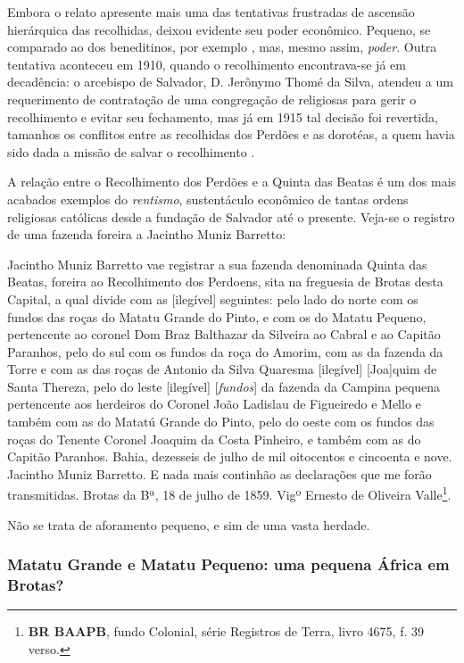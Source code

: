 Embora o relato apresente mais uma das tentativas frustradas de ascensão hierárquica das recolhidas, deixou evidente seu poder econômico. Pequeno, se comparado ao dos beneditinos, por exemplo \cite{bento_tombo_1945}, mas, mesmo assim, \textit{poder}. Outra tentativa aconteceu em 1910, quando o recolhimento encontrava-se já em decadência: o arcebispo de Salvador, D. Jerônymo Thomé da Silva, atendeu a um requerimento de contratação de uma congregação de religiosas para gerir o recolhimento e evitar seu fechamento, mas já em 1915 tal decisão foi revertida, tamanhos os conflitos entre as recolhidas dos Perdões e as dorotéas, a quem havia sido dada a missão de salvar o recolhimento \cite{ramalho_sagrado_2014}.

A relação entre o Recolhimento dos Perdões e a Quinta das Beatas é um dos mais acabados exemplos do \textit{rentismo}, sustentáculo econômico de tantas ordens religiosas católicas desde a fundação de Salvador até o presente. Veja-se o registro de uma fazenda foreira a Jacintho Muniz Barretto:

\begin{citacao}
Jacintho Muniz Barretto vae registrar a sua fazenda denominada Quinta das Beatas, foreira ao Recolhimento dos Perdoens, sita na freguesia de Brotas desta Capital, a qual divide com as [ilegível] seguintes: pelo lado do norte com os fundos das roças do Matatu Grande do Pinto, e com os do Matatu Pequeno, pertencente ao coronel Dom Braz Balthazar da Silveira ao Cabral e ao Capitão Paranhos, pelo do sul com os fundos da roça do Amorim, com as da fazenda da Torre e com as das roças de Antonio da Silva Quaresma [ilegível] [Joa]quim de Santa Thereza, pelo do leste [ilegível] [\textit{fundos}] da fazenda da Campina pequena pertencente aos herdeiros do Coronel João Ladislau de Figueiredo e Mello e também com as do Matatú Grande do Pinto, pelo do oeste com os fundos das roças do Tenente Coronel Joaquim da Costa Pinheiro, e também com as do Capitão Paranhos. Bahia, dezesseis de julho de mil oitocentos e cincoenta e nove. Jacintho Muniz Barretto. E nada mais continhão as declarações que me forão transmitidas. Brotas da Bª, 18 de julho de 1859. Vigº Ernesto de Oliveira Valle\footnote{\textbf{BR BAAPB}, fundo Colonial, série Registros de Terra, livro 4675, f. 39 verso.}.
\end{citacao}

Não se trata de aforamento pequeno, e sim de uma vasta herdade. 

\subsubsection{Matatu Grande e Matatu Pequeno: uma pequena África em Brotas?}\label{subsubsec:matatu}

